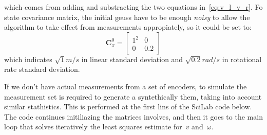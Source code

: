 which comes from adding and substracting the two equations in~\ref{eq:v_l_v_r}. Fo state covariance matrix, the initial geuss have to be enough \textit{noisy} to allow the algorithm to take effect from measurements appropiately, so it could be set to: 
\begin{equation}
 \mathbf{C}^0_{x} = 
 \left[
 \begin{array}{cc}
  1^2 & 0 \\
  0 & 0.2
  \end{array}
 \right]
\end{equation}
which indicates $\sqrt{1}m/s$ in linear standard deviation and $\sqrt{0.2}rad/s$ in rotational rate standard deviation. 

If we don't have actual measurements from a set of encoders, to simulate the measurement set is required to generate a syntethically them, taking into account similar stathistics. This is performed at the first lins of the SciLab code below.  The code continues initiliazing the matrices involves, and then it goes to the main loop that solves iteratively the least squares estimate for~$v$ and~$\omega$.
